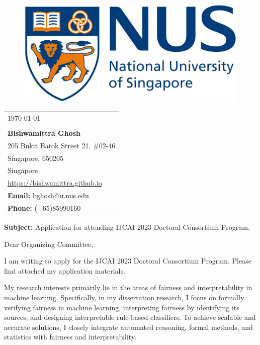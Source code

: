 \documentclass[a4paper,10pt]{article}
\newcommand{\blue}[1]{\textcolor{blue}{#1}}
\begin{document}
	
	
	
	\begin{figure}[t]
		\includegraphics[scale=0.03]{logo}
	\end{figure}
	\noindent\makebox[\linewidth]{\rule{\textwidth}{1pt}}
	
	\begin{flushright}
		\begin{tabular}{l@{}}
			\today \\
			\newline \\
			\textbf{Bishwamittra Ghosh}\\
			205 Bukit Batok Street 21, \#02-46\\ 
			Singapore, 650205\\
			Singapore\\
			\blue{\url{https://bishwamittra.github.io}}\\
			\textbf{Email:} bghosh@u.nus.edu\\
			\textbf{Phone:} (+65)85990160\\
		\end{tabular}%
	\end{flushright}
	


	\textbf{Subject:} Application for attending IJCAI 2023 Doctoral Consortium Program.
	
	
	
	\vspace{1em}
	Dear Organizing Committee,
	
	
	\vspace{1em}
	I am writing to apply for the IJCAI 2023 Doctoral Consortium Program. Please find attached my application materials.
	
	\vspace{1em}
	
	My research interests primarily lie in the areas of fairness and interpretability in machine learning. Specifically, in my dissertation research, I focus on formally verifying fairness in machine learning, interpreting fairness by identifying its sources, and designing interpretable rule-based classifiers. To achieve scalable and accurate solutions, I closely integrate automated reasoning, formal methods, and statistics with fairness and interpretability.
	
\end{document}
